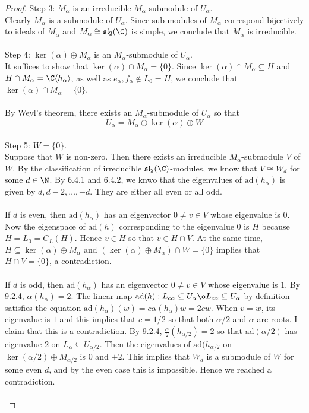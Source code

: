 \documentclass[a4paper]{article}
\begin{document}
\begin{lmm}{}{}
\begin{proof}
Step 3: $M_\alpha$ is an irreducible $M_\alpha$-submodule of $U_\alpha$. \\
Clearly $M_\alpha$ is a submodule of $U_\alpha$. Since sub-modules of $M_\alpha$ correspond bijectively to ideals of $M_\alpha$ and $M_\alpha\cong\mathfrak{sl}_2(\C)$ is simple, we conclude that $M_\alpha$ is irreducible. \\~\\

Step 4: $\ker(\alpha)\oplus M_\alpha$ is an $M_\alpha$-submodule of $U_\alpha$. \\
It suffices to show that $\ker(\alpha)\cap M_\alpha=\{0\}$. Since $\ker(\alpha)\cap M_\alpha\subseteq H$ and $H\cap M_\alpha=\C\langle h_\alpha\rangle$, as well as $e_\alpha,f_\alpha\notin L_0=H$, we conclude that $\ker(\alpha)\cap M_\alpha=\{0\}$. \\~\\

By Weyl's theorem, there exists an $M_\alpha$-submodule of $U_\alpha$ so that $$U_\alpha=M_\alpha\oplus\ker(\alpha)\oplus W$$~\\

Step 5: $W=\{0\}$. \\
Suppose that $W$ is non-zero. Then there exists an irreducible $M_\alpha$-submodule $V$ of $W$. By the classification of irreducible $\mathfrak{sl}_2(\C)$-modules, we know that $V\cong W_d$ for some $d\in\N$. By 6.4.1 and 6.4.2, we knwo that the eigenvalues of $\text{ad}(h_\alpha)$ is given by $d,d-2,\dots,-d$. They are either all even or all odd. \\~\\

If $d$ is even, then $\text{ad}(h_\alpha)$ has an eigenvector $0\neq v\in V$ whose eigenvalue is $0$. Now the eigenspace of $\text{ad}(h)$ corresponding to the eigenvalue $0$ is $H$ because $H=L_0=C_L(H)$. Hence $v\in H$ so that $v\in H\cap V$. At the same time, $H\subseteq\ker(\alpha)\oplus M_\alpha$ and $(\ker(\alpha)\oplus M_\alpha)\cap W=\{0\}$ implies that $H\cap V=\{0\}$, a contradiction. \\~\\

If $d$ is odd, then $\text{ad}(h_\alpha)$ has an eigenvector $0\neq v\in V$ whose eigenvalue is $1$. By 9.2.4, $\alpha(h_\alpha)=2$. The linear map $\text{ad}(h):L_{c\alpha}\subseteq U_\alpha\o L_{c\alpha}\subseteq U_\alpha$ by definition satisfies the equation $\text{ad}(h_\alpha)(w)=c\alpha(h_\alpha)w=2cw$. When $v=w$, its eigenvalue is $1$ and this implies that $c=1/2$ so that both $\alpha/2$ and $\alpha$ are roots. I claim that this is a contradiction. By 9.2.4, $\frac{\alpha}{2}(h_{\alpha/2})=2$ so that $\text{ad}(\alpha/2)$ has eigenvalue $2$ on $L_\alpha\subseteq U_{\alpha/2}$. Then the eigenvalues of $\text{ad}(h_{\alpha/2}$ on $\ker(\alpha/2)\oplus M_{\alpha/2}$ is $0$ and $\pm2$. This implies that $W_d$ is a submodule of $W$ for some even $d$, and by the even case this is impossible. Hence we reached a contradiction. \\~\\


\end{proof}
\end{lmm}
\end{document}
